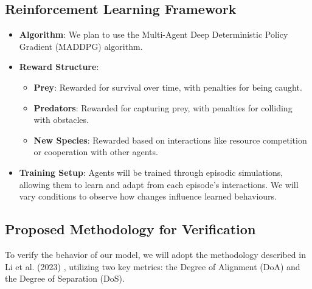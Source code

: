 \documentclass[9pt]{pnas-new}
\begin{document}
\subsection{Reinforcement Learning Framework}
\begin{itemize}
    \item \textbf{Algorithm}: We plan to use the Multi-Agent Deep Deterministic Policy Gradient (MADDPG) algorithm.
    \item \textbf{Reward Structure}:
        \begin{itemize}
            \item \textbf{Prey}: Rewarded for survival over time, with penalties for being caught.
            \item \textbf{Predators}: Rewarded for capturing prey, with penalties for colliding with obstacles.
            \item \textbf{New Species}: Rewarded based on interactions like resource competition or cooperation with other agents.
        \end{itemize}
    \item \textbf{Training Setup}: Agents will be trained through episodic simulations, allowing them to learn and adapt from each episode's interactions. We will vary conditions to observe how changes influence learned behaviours.
\end{itemize}

\subsection*{Proposed Methodology for Verification}

To verify the behavior of our model, we will adopt the methodology described in Li et al. (2023) \cite{li2023predator}, utilizing two key metrics: the Degree of Alignment (DoA) and the Degree of Separation (DoS).
\end{document}
